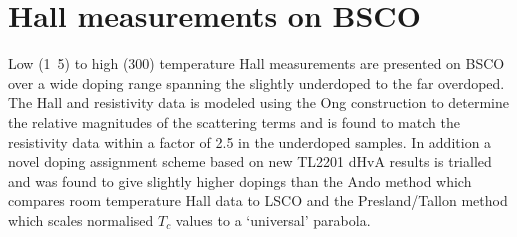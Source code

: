 \chapter{Hall measurements on \acs{BSCO}}
    \label{Sec:HallBSCO}

\begin{chapterabstract}
Low (\unit{1.5}{\kelvin}) to high (\unit{300}{\kelvin}) temperature Hall measurements are presented on \ac{BSCO} over a wide doping range spanning the slightly underdoped to the far overdoped. The Hall and resistivity data is modeled using the Ong construction to determine the relative magnitudes of the scattering terms and is found to match the resistivity data within a factor of 2.5 in the underdoped samples. In addition a novel doping assignment scheme based on new \ac{TL2201} \ac{dHvA} results is trialled and was found to give slightly higher dopings than the Ando method which compares room temperature Hall data to \ac{LSCO} and the Presland/Tallon method which scales normalised $T_c$ values to a `universal' parabola.
\end{chapterabstract}










